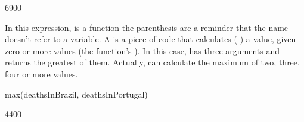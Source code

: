 \documentclass[letterpaper,10pt,english]{sphinxmanual}
\begin{document}

{
\begin{sphinxVerbatim}[commandchars=\\\{\}]
\llap{\color{nbsphinxin}[ ]:\,\hspace{\fboxrule}\hspace{\fboxsep}}
6900
\end{sphinxVerbatim}
}

In this expression,  is a function \textendash{} the parenthesis are a reminder that the name  doesn’t refer to a variable. A  is a piece of code that calculates (  ) a value, given zero or more values (the function’s  ). In this case,  has three arguments and returns the greatest of them. Actually,  can calculate the maximum of two, three, four or more values.


{
\begin{sphinxVerbatim}[commandchars=\\\{\}]
\llap{\color{nbsphinxin}[ ]:\,\hspace{\fboxrule}\hspace{\fboxsep}}
max(deathsInBrazil, deathsInPortugal)
\end{sphinxVerbatim}
}


{
\begin{sphinxVerbatim}[commandchars=\\\{\}]
\llap{\color{nbsphinxin}[ ]:\,\hspace{\fboxrule}\hspace{\fboxsep}}
4400
\end{sphinxVerbatim}
}
\end{document}

